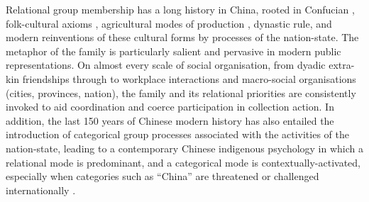Relational group membership has a long history in China, rooted in Confucian \citep{Hwang1999}, folk-cultural axioms \citep{Wang2009}, agricultural modes of production \citep{Talhelm2014,Fei1992}, dynastic rule, and modern reinventions of these cultural forms by processes of the nation-state\citep{Liu2014}. The metaphor of the family is particularly salient and pervasive in modern public representations.  On almost every scale of social organisation, from dyadic extra-kin friendships through to workplace interactions and macro-social organisations (cities, provinces, nation), the family and its relational priorities are consistently invoked to aid coordination and coerce participation in collection action.
In addition, the last 150 years of Chinese modern history has also entailed the introduction of categorical group processes associated with the activities of the nation-state, leading to a contemporary Chinese indigenous psychology in which a relational mode is predominant, and a categorical mode is contextually-activated, especially when categories such as ``China'' are threatened or challenged internationally \citep{Liu2009}.

